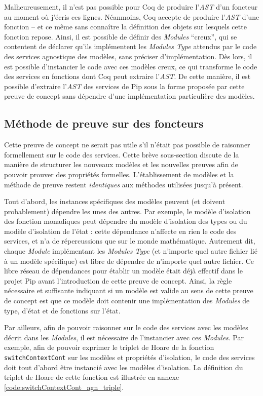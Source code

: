 		Malheureusement, il n'est pas possible pour Coq de produire l'\emph{AST} d'un foncteur au moment où j'écris ces lignes. Néanmoins, Coq accepte de produire l'\emph{AST} d'une fonction -- et ce même sans connaître la définition des objets sur lesquels cette fonction repose. Ainsi, il est possible de définir des \emph{Modules} ``creux'', qui se contentent de déclarer qu'ils implémentent les \emph{Modules Type} attendus par le code des services agnostique des modèles, sans préciser d'implémentation. Dès lors, il est possible d'instancier le code avec ces modèles creux, ce qui transforme le code des services en fonctions dont Coq peut extraire l'\emph{AST}. De cette manière, il est possible d'extraire l'\emph{AST} des services de Pip sous la forme proposée par cette preuve de concept sans dépendre d'une implémentation particulière des modèles.

		\subsection{Méthode de preuve sur des foncteurs}

		Cette preuve de concept ne serait pas utile s'il n'était pas possible de raisonner formellement sur le code des services. Cette brève sous-section discute de la manière de structurer les nouveaux modèles et les nouvelles preuves afin de pouvoir prouver des propriétés formelles. L'établissement de modèles et la méthode de preuve restent \emph{identiques} aux méthodes utilisées jusqu'à présent.

		Tout d'abord, les instances spécifiques des modèles peuvent (et doivent probablement) dépendre les unes des autres. Par exemple, le modèle d'isolation des fonction monadiques peut dépendre du modèle d'isolation des types ou du modèle d'isolation de l'état : cette dépendance n'affecte en rien le code des services, et n'a de répercussions que sur le monde mathématique. Autrement dit, chaque \emph{Module} implémentant les \emph{Modules Type} (et n'importe quel autre fichier lié à un modèle spécifique) est libre de dépendre de n'importe quel autre fichier. Ce libre réseau de dépendances pour établir un modèle était déjà effectif dans le projet Pip avant l'introduction de cette preuve de concept. Ainsi, la règle nécessaire et suffisante indiquant si un modèle est valide au sens de cette preuve de concept est que ce modèle doit contenir une implémentation des \emph{Modules} de type, d'état et de fonctions sur l'état.

		Par ailleurs, afin de pouvoir raisonner sur le code des services avec les modèles décrit dans les \emph{Modules}, il est nécessaire de l'instancier avec ces \emph{Modules}. Par exemple, afin de pouvoir exprimer le triplet de Hoare de la fonction \texttt{switchContextCont} sur les modèles et propriétés d'isolation, le code des services doit tout d'abord être instancié avec les modèles d'isolation. La définition du triplet de Hoare de cette fonction est illustrée en annexe \ref{code:switchContextCont_agn_triple}.

